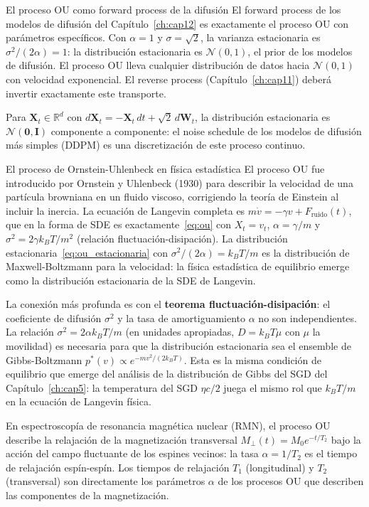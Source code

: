 \begin{observacion}{El proceso OU como forward process de la difusión}
El forward process de los modelos de difusión del Capítulo~\ref{ch:cap12} es exactamente
el proceso OU con parámetros específicos. Con $\alpha = 1$ y $\sigma = \sqrt{2}$,
la varianza estacionaria es $\sigma^2/(2\alpha) = 1$: la distribución estacionaria
es $\mathcal{N}(0,1)$, el prior de los modelos de difusión. El proceso OU lleva
cualquier distribución de datos hacia $\mathcal{N}(0,1)$ con velocidad
exponencial. El reverse process (Capítulo~\ref{ch:cap11}) deberá invertir exactamente
este transporte.

Para $\bm{X}_t \in \mathbb{R}^d$ con $d\bm{X}_t = -\bm{X}_t\,dt +
\sqrt{2}\,d\bm{W}_t$, la distribución estacionaria es $\mathcal{N}(\bm{0},
\bm{I})$ componente a componente: el noise schedule de los modelos de difusión más
simples (DDPM) es una discretización de este proceso continuo.
\end{observacion}

\begin{fisicaconexion}{El proceso de Ornstein-Uhlenbeck en física estadística}
El proceso OU fue introducido por Ornstein y Uhlenbeck (1930) para describir
la velocidad de una partícula browniana en un fluido viscoso, corrigiendo la
teoría de Einstein al incluir la inercia. La ecuación de Langevin completa es
$m\dot{v} = -\gamma v + F_{\mathrm{ruido}}(t)$, que en la forma de SDE es
exactamente~\eqref{eq:ou} con $X_t = v_t$, $\alpha = \gamma/m$ y
$\sigma^2 = 2\gamma k_BT/m^2$ (relación fluctuación-disipación). La distribución
estacionaria~\eqref{eq:ou_estacionaria} con $\sigma^2/(2\alpha) = k_BT/m$
es la distribución de Maxwell-Boltzmann para la velocidad: la física
estadística de equilibrio emerge como la distribución estacionaria de la SDE
de Langevin.

La conexión más profunda es con el \textbf{teorema fluctuación-disipación}: el
coeficiente de difusión $\sigma^2$ y la tasa de amortiguamiento $\alpha$ no son
independientes. La relación $\sigma^2 = 2\alpha k_BT/m$ (en unidades apropiadas,
$D = k_BT\mu$ con $\mu$ la movilidad) es necesaria para que la distribución
estacionaria sea el ensemble de Gibbs-Boltzmann $p^*(v) \propto e^{-mv^2/(2k_BT)}$.
Esta es la misma condición de equilibrio que emerge del análisis de la distribución
de Gibbs del SGD del Capítulo~\ref{ch:cap5}: la temperatura del SGD $\eta c/2$
juega el mismo rol que $k_BT/m$ en la ecuación de Langevin física.

En espectroscopía de resonancia magnética nuclear (RMN), el proceso OU describe
la relajación de la magnetización transversal $M_\perp(t) = M_0 e^{-t/T_2}$
bajo la acción del campo fluctuante de los espines vecinos: la tasa $\alpha =
1/T_2$ es el tiempo de relajación espín-espín. Los tiempos de relajación $T_1$
(longitudinal) y $T_2$ (transversal) son directamente los parámetros $\alpha$
de los procesos OU que describen las componentes de la magnetización.
\end{fisicaconexion}


